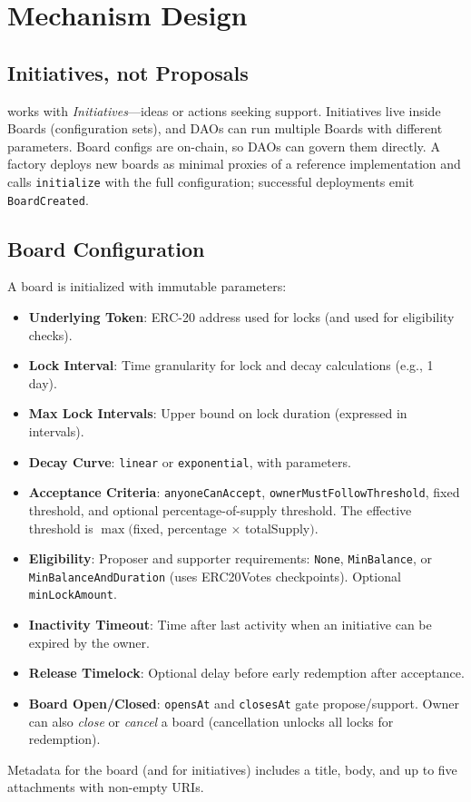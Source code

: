 \section{Mechanism Design}

\subsection{Initiatives, not Proposals}
\signals{} works with \emph{Initiatives}---ideas or actions seeking support. Initiatives live inside Boards (configuration sets), and DAOs can run multiple Boards with different parameters. Board configs are on-chain, so DAOs can govern them directly. A factory deploys new boards as minimal proxies of a reference implementation and calls \texttt{initialize} with the full configuration; successful deployments emit \texttt{BoardCreated}.

\subsection{Board Configuration}
A board is initialized with immutable parameters:
\begin{itemize}[leftmargin=*]
  \item \textbf{Underlying Token}: ERC-20 address used for locks (and used for eligibility checks).
  \item \textbf{Lock Interval}: Time granularity for lock and decay calculations (e.g., 1 day).
  \item \textbf{Max Lock Intervals}: Upper bound on lock duration (expressed in intervals).
  \item \textbf{Decay Curve}: \texttt{linear} or \texttt{exponential}, with parameters.
  \item \textbf{Acceptance Criteria}: \texttt{anyoneCanAccept}, \texttt{ownerMustFollowThreshold}, fixed threshold, and optional percentage-of-supply threshold. The effective threshold is \(\max(\)fixed, percentage \(\times\) totalSupply\()\).
  \item \textbf{Eligibility}: Proposer and supporter requirements: \texttt{None}, \texttt{MinBalance}, or \texttt{MinBalanceAndDuration} (uses ERC20Votes checkpoints). Optional \texttt{minLockAmount}.
  \item \textbf{Inactivity Timeout}: Time after last activity when an initiative can be expired by the owner.
  \item \textbf{Release Timelock}: Optional delay before early redemption after acceptance.
  \item \textbf{Board Open/Closed}: \texttt{opensAt} and \texttt{closesAt} gate propose/support. Owner can also \emph{close} or \emph{cancel} a board (cancellation unlocks all locks for redemption).
\end{itemize}
Metadata for the board (and for initiatives) includes a title, body, and up to five attachments with non-empty URIs.

